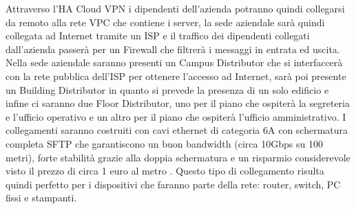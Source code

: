 Attraverso l'HA Cloud VPN i dipendenti dell'azienda potranno quindi collegarsi da remoto alla rete VPC che contiene i server, la sede aziendale sarà quindi collegata ad Internet tramite un ISP e il traffico dei dipendenti collegati dall'azienda passerà per un Firewall che filtrerà i messaggi in entrata ed uscita. Nella sede aziendale saranno presenti un Campus Distributor che si interfaccerà con la rete pubblica dell'ISP per ottenere l'accesso ad Internet, sarà poi presente un Building Distributor in quanto si prevede la presenza di un solo edificio e infine ci saranno due Floor Distributor, uno per il piano che ospiterà la segreteria e l'ufficio operativo e un altro per il piano che ospiterà l'ufficio amministrativo. I collegamenti saranno costruiti con cavi ethernet di categoria 6A con schermatura completa SFTP che garantiscono un buon bandwidth (circa 10Gbps su 100 metri), forte stabilità grazie alla doppia schermatura e un risparmio considerevole visto il prezzo di circa 1 euro al metro \cite{Cables}. Questo tipo di collegamento risulta quindi perfetto per i dispositivi che faranno parte della rete: router, switch, PC fissi e stampanti. 
